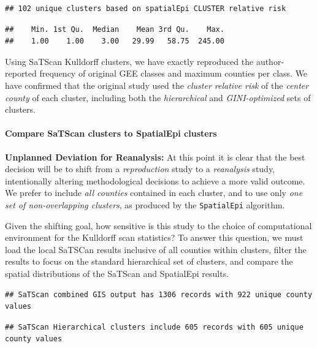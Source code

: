 \documentclass[
]{article}
\begin{document}
\begin{verbatim}
## 102 unique clusters based on spatialEpi CLUSTER relative risk
\end{verbatim}

\begin{verbatim}
##    Min. 1st Qu.  Median    Mean 3rd Qu.    Max. 
##    1.00    1.00    3.00   29.99   58.75  245.00
\end{verbatim}

Using SaTScan Kulldorff clusters, we have exactly reproduced the
author-reported frequency of original GEE classes and maximum counties
per class. We have confirmed that the original study used the
\emph{cluster relative risk} of the \emph{center county} of each
cluster, including both the \emph{hierarchical} and
\emph{GINI-optimized} sets of clusters.

\hypertarget{compare-satscan-clusters-to-spatialepi-clusters}{%
\paragraph{Compare SaTScan clusters to SpatialEpi
clusters}\label{compare-satscan-clusters-to-spatialepi-clusters}}

\textbf{Unplanned Deviation for Reanalysis:} At this point it is clear
that the best decision will be to shift from a \emph{reproduction} study
to a \emph{reanalysis} study, intentionally altering methodological
decisions to achieve a more valid outcome. We prefer to include
\emph{all counties} contained in each cluster, and to use only \emph{one
set of non-overlapping clusters}, as produced by the \texttt{SpatialEpi}
algorithm.

Given the shifting goal, how sensitive is this study to the choice of
computational environment for the Kulldorff scan statistics? To answer
this question, we must load the local SaTSCan results inclusive of all
counties within clusters, filter the results to focus on the standard
hierarchical set of clusters, and compare the spatial distributions of
the SaTScan and SpatialEpi results.

\begin{verbatim}
## SaTScan combined GIS output has 1306 records with 922 unique county values
\end{verbatim}

\begin{verbatim}
## SaTScan Hierarchical clusters include 605 records with 605 unique county values
\end{verbatim}
\end{document}
